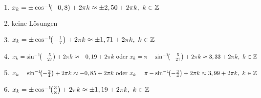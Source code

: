 \begin{Answer}[ref=sincosGleichungenA1]
\begin{enumerate}[label=\alph*)]
		\item \(x_k=\pm \arccoss{-0,8} +2\pi k\approx \pm 2,50 +2\pi k,\ k\in\Z\)
		\item keine Lösungen
		\item \(x_k=\pm \arccoss{-\frac{1}{7}} +2\pi k\approx \pm 1,71 +2\pi k,\ k\in\Z\)
		\item \(x_k=\arcsinn{-\frac{5}{27}} +2\pi k\approx -0,19+2\pi k\text{ oder }x_k=\pi-\arcsinn{-\frac{5}{27}} +2\pi k\approx 3,33+2\pi k,\ k\in\Z\)
		\item \(x_k=\arcsinn{-\frac{3}{4}} +2\pi k\approx -0,85+2\pi k\text{ oder }x_k=\pi-\arcsinn{-\frac{3}{4}} +2\pi k\approx 3,99+2\pi k,\ k\in\Z\)
		\item \(x_k=\pm \arccoss{\frac{3}{8}} +2\pi k\approx \pm 1,19 +2\pi k,\ k\in\Z\)
	\end{enumerate}
\end{Answer}